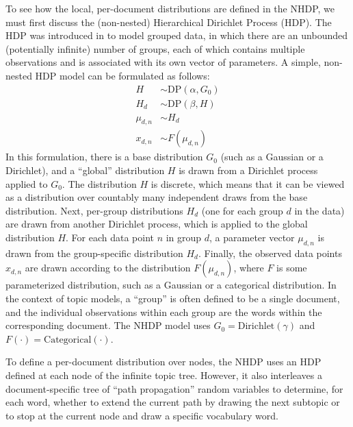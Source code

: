 \documentclass{article}
\begin{document}
To see how the local, per-document distributions are defined in the NHDP, we must first discuss the (non-nested) Hierarchical Dirichlet Process (HDP).
The HDP was introduced in \cite{teh2005hdp} to model grouped data, in which there are an unbounded (potentially infinite) number of groups, each of which contains multiple observations and is associated with its own vector of parameters.
A simple, non-nested HDP model can be formulated as follows:
\begin{align}
H &\sim \text{DP}(\alpha, G_0) \\
H_d &\sim \text{DP}(\beta, H) \\
\mu_{d,n} &\sim H_d \\
x_{d,n} &\sim F(\mu_{d,n})
\end{align}
In this formulation, there is a base distribution $G_0$ (such as a Gaussian or a Dirichlet), and a ``global'' distribution $H$ is drawn from a Dirichlet process applied to $G_0$.
The distribution $H$ is discrete, which means that it can be viewed as a distribution over countably many independent draws from the base distribution.
Next, per-group distributions $H_d$ (one for each group $d$ in the data) are drawn from another Dirichlet process, which is applied to the global distribution $H$.
For each data point $n$ in group $d$, a parameter vector $\mu_{d,n}$ is drawn from the group-specific distribution $H_d$.
Finally, the observed data points $x_{d,n}$ are drawn according to the distribution $F(\mu_{d,n})$, where $F$ is some parameterized distribution, such as a Gaussian or a categorical distribution.
In the context of topic models, a ``group'' is often defined to be a single document, and the individual observations within each group are the words within the corresponding document.
The NHDP model uses $G_0 = \text{Dirichlet}(\gamma)$ and $F(\cdot) = \text{Categorical}(\cdot)$.

To define a per-document distribution over nodes, the NHDP uses an HDP defined at each node of the infinite topic tree.
However, it also interleaves a document-specific tree of ``path propagation'' random variables to determine, for each word, whether to extend the current path by drawing the next subtopic or to stop at the current node and draw a specific vocabulary word.
\end{document}

